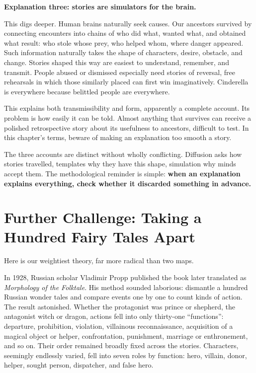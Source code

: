 \textbf{Explanation three: stories are simulators for the brain.}

This digs deeper. Human brains naturally seek causes. Our ancestors survived by connecting encounters into chains of who did what, wanted what, and obtained what result: who stole whose prey, who helped whom, where danger appeared. Such information naturally takes the shape of characters, desire, obstacle, and change. Stories shaped this way are easiest to understand, remember, and transmit. People abused or dismissed especially need stories of reversal, free rehearsals in which those similarly placed can first win imaginatively. Cinderella is everywhere because belittled people are everywhere.

This explains both transmissibility and form, apparently a complete account. Its problem is how easily it can be told. Almost anything that survives can receive a polished retrospective story about its usefulness to ancestors, difficult to test. In this chapter's terms, beware of making an explanation too smooth a story.

The three accounts are distinct without wholly conflicting. Diffusion asks how stories travelled, templates why they have this shape, simulation why minds accept them. The methodological reminder is simple: \textbf{when an explanation explains everything, check whether it discarded something in advance.}

\section[Further Challenge: A Hundred Fairy Tales]{Further Challenge: Taking a Hundred Fairy Tales Apart}
Here is our weightiest theory, far more radical than two maps.

In 1928, Russian scholar Vladimir Propp published the book later translated as \emph{Morphology of the Folktale}. His method sounded laborious: dismantle a hundred Russian wonder tales and compare events one by one to count kinds of action. The result astonished. Whether the protagonist was prince or shepherd, the antagonist witch or dragon, actions fell into only thirty-one ``functions'': departure, prohibition, violation, villainous reconnaissance, acquisition of a magical object or helper, confrontation, punishment, marriage or enthronement, and so on. Their order remained broadly fixed across the stories. Characters, seemingly endlessly varied, fell into seven roles by function: hero, villain, donor, helper, sought person, dispatcher, and false hero.

